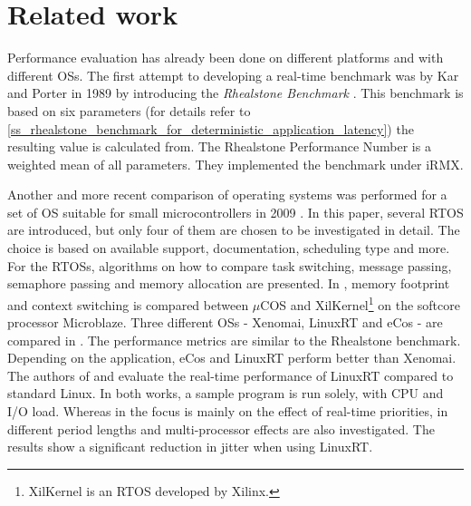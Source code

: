 \section{Related work}
Performance evaluation has already been done on different platforms and with different \acp{OS}. 
The first attempt to developing a real-time benchmark was by Kar and Porter in 1989 by introducing the \textit{Rhealstone Benchmark} \cite{kar:itrb} \cite{kar:artbp}. 
This benchmark is based on six parameters (for details refer to \ref{ss_rhealstone_benchmark_for_deterministic_application_latency}) the resulting value is calculated from.
The Rhealstone Performance Number is a weighted mean of all parameters. They implemented the benchmark under iRMX.
\par
Another and more recent comparison of operating systems was performed for a set of \ac{OS} suitable for small microcontrollers in 2009 \cite{Anh:sapeortosfsm}. 
In this paper, several \ac{RTOS} are introduced, but only four of them are chosen to be investigated in detail.
The choice is based on available support, documentation, scheduling type and more. 
For the \acp{RTOS}, algorithms on how to compare task switching, message passing, semaphore passing and memory allocation are presented.  
In \cite{gokhan:cstamfcoxamom}, memory footprint and context switching is compared between $\mu$COS and XilKernel\footnote{XilKernel \cite{xilinx:xilkernel} is an \ac{RTOS} developed by Xilinx.} on the softcore processor Microblaze.
Three different \acp{OS} - Xenomai, LinuxRT and eCos \cite{ecos} - are compared in \cite{Marieska:opokbaertosbaa}.
The performance metrics are similar to the Rhealstone benchmark.
Depending on the application, eCos and LinuxRT perform better than Xenomai.
The authors of \cite{cereia:peoaemulatrp} and \cite{betz:eeotlrpfrta} evaluate the real-time performance of LinuxRT compared to standard Linux.
In both works, a sample program is run solely, with CPU and I/O load. 
Whereas in \cite{cereia:peoaemulatrp} the focus is mainly on the effect of real-time priorities, in \cite{betz:eeotlrpfrta} different period lengths and multi-processor effects are also investigated. 
The results show a significant reduction in jitter when using LinuxRT.
\par
[Related work on OS jitter]

